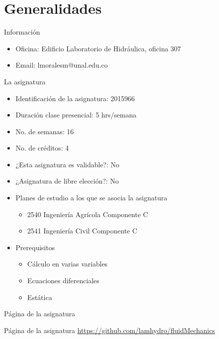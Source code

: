 \documentclass [xcolor=svgnames, t] {beamer}
\begin{document}
\section{Generalidades}
\begin{frame}{Informaci\'on}
\begin{exampleblock}{}
\begin{itemize}
\item \alert{Oficina}: Edificio Laboratorio de Hidr\'aulica, oficina 307 
\item \alert{Email}: lmoralesm@unal.edu.co
\end{itemize}
\end{exampleblock}
\end{frame}

\begin{frame}{La asignatura}
\begin{itemize}
\item Identificaci\'on de la asignatura: \alert{2015966}
\item Duraci\'on clase presencial: \alert{5 hrs/semana}
\item No. de semanas: \alert{16}
\item No. de cr\'editos: \alert{4}
\item ¿Esta asignatura es validable?: \alert{No}
\item ¿Asignatura de libre elecci\'on?: \alert{No}
\item Planes de estudio a los que se asocia la asignatura
\begin{itemize}
\item \alert{2540 Ingenier\'ia Agr\'icola Componente C}
\item \alert{2541 Ingenier\'ia Civil Componente C}
\end{itemize}
\item Prerequisitos
\begin{itemize}
\item \alert{C\'alculo en varias variables}
\item \alert{Ecuaciones diferenciales}
\item \alert{Est\'atica}
\end{itemize}
\end{itemize}
\end{frame}

\begin{frame}{P\'agina de la asignatura}
\begin{block}{P\'agina de la asignatura}
\href{https://github.com/lamhydro/fluidMechanics}{https://github.com/lamhydro/fluidMechanics}
\end{block}
\end{frame}
\end{document}
